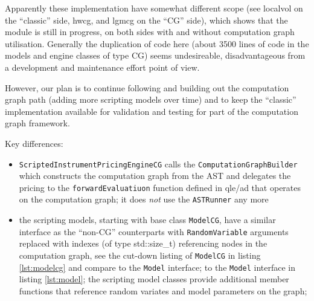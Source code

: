 Apparently these implementation have somewhat different scope (see localvol on the ``classic'' side,
hwcg, and lgmcg on the ``CG'' side), which shows that the module is
still in progress, on both sides with and without computation graph utilisation.
Generally the duplication of code here (about 3500 lines of code in the models and engine
classes of type CG) seems undesireable, disadvantageous from a development and maintenance effort
point of view.

However, our plan is to continue following and building out the computation graph
path (adding more scripting models over time) and to keep the ``classic'' implementation available
for validation and testing for part of the computation graph framework.

Key differences:
\begin{itemize}
\item {\tt ScriptedInstrumentPricingEngineCG} calls the {\tt ComputationGraphBuilder} which
  constructs the computation graph from the AST and delegates the pricing to the
  {\tt forwardEvaluatiuon} function defined in qle/ad that operates on the computation graph;
  it does {\em not} use the {\tt ASTRunner} any more
\item the scripting models, starting with base class {\tt ModelCG}, have a similar interface as
  the ``non-CG'' counterparts with {\tt RandomVariable} arguments replaced with indexes (of type
  std::size\_t) referencing nodes in the computation graph, see the cut-down listing of
  {\tt ModelCG} in listing \ref{lst:modelcg} and compare
\ifdefined\RiskCatalogue
to the {\tt Model} interface;
\else
to the {\tt Model} interface in listing  \ref{lst:model};
\fi
the scripting model classes provide additional member functions that reference random variates and model parameters on the graph;
\end{itemize}

